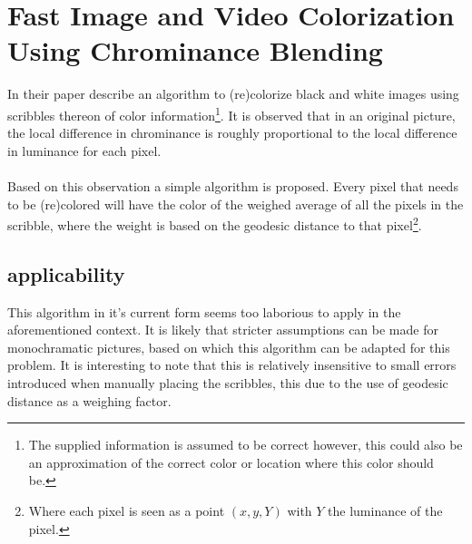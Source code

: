 
\section{Fast Image and Video Colorization Using Chrominance
  Blending}

        In their paper \cite{yatziv2006fast} describe an algorithm to
        (re)colorize black and white images using scribbles thereon of color
        information\footnote{The supplied information is assumed to be correct
        however, this could also be an approximation of the correct color or
        location where this color should be.}. It is observed that in an
        original picture, the local difference in chrominance is roughly
        proportional to the local difference in luminance for each pixel.\\
        \\
        Based on this observation a simple algorithm is proposed. Every pixel
        that needs to be (re)colored will have the color of the weighed
        average of all the pixels in the scribble, where the weight is based
        on the geodesic distance to that pixel\footnote{Where each pixel is
        seen as a point $(x, y, Y)$ with $Y$ the luminance of the
        pixel.}.

        \subsection{applicability}
                This algorithm in it's current form seems too
                laborious to apply in the aforementioned context. It
                is likely that stricter assumptions can be made for
                monochramatic pictures, based on which this algorithm
                can be adapted for this problem. It is interesting to
                note that this is relatively insensitive to small
                errors introduced when manually placing the scribbles,
                this due to the use of geodesic distance as a weighing factor.
        